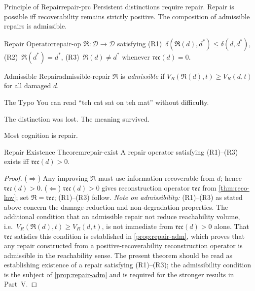 \documentclass[12pt,twoside,openright]{book}
\newcommand{\repair}{\mathfrak{R}}
\newcommand{\reco}{\mathfrak{rec}}
\begin{document}
\begin{principle}{Principle of Repair}{repair-prc}
  Persistent distinctions require repair. Repair is
  possible iff recoverability remains strictly positive.
  The composition of admissible repairs is admissible.
\end{principle}

\begin{definition}{Repair Operator}{repair-op}
  $\repair:\mathcal{D}\to\mathcal{D}$ satisfying
  (R1)~$\delta(\repair(d),d^*)\le\delta(d,d^*)$,
  (R2)~$\repair(d^*)=d^*$,
  (R3)~$\repair(d)\ne d^*$ whenever $\reco(d)=0$.
\end{definition}

\begin{definition}{Admissible Repair}{admissible-repair}
  $\repair$ is \emph{admissible} if
  $V_R(\repair(d),t)\ge V_R(d,t)$ for all damaged $d$.
\end{definition}

\begin{distinctionaside}{The Typo}
You can read ``teh cat sat on teh mat'' without difficulty.

The distinction was lost. The meaning survived.

Most cognition is repair.
\end{distinctionaside}

\begin{theorem}{Repair Existence Theorem}{repair-exist}
  A repair operator satisfying (R1)--(R3) exists iff
  $\reco(d)>0$.
\end{theorem}
\begin{proof}
  ($\Rightarrow$) Any improving $\repair$ must use
  information recoverable from $d$; hence $\reco(d)>0$.
  ($\Leftarrow$) $\reco(d)>0$ gives reconstruction
  operator $\mathfrak{rec}$ from \cref{thm:reco-law};
  set $\repair=\mathfrak{rec}$; (R1)--(R3) follow.
  \emph{Note on admissibility:} (R1)--(R3) as stated above
  concern the damage-reduction and non-degradation
  properties. The additional condition that an admissible
  repair not reduce reachability volume, i.e.\
  $V_R(\repair(d),t) \ge V_R(d,t)$, is not immediate from
  $\reco(d)>0$ alone. That $\mathfrak{rec}$ satisfies
  this condition is established in
  \cref{prop:repair-adm}, which proves that any
  repair constructed from a positive-recoverability
  reconstruction operator is admissible in the reachability
  sense. The present theorem should be read as establishing
  existence of a repair satisfying (R1)--(R3); the
  admissibility condition is the subject of
  \cref{prop:repair-adm} and is required for the
  stronger results in Part~V.
\end{proof}
\end{document}
